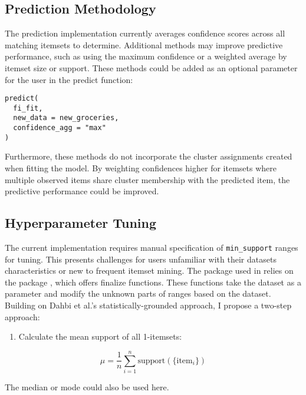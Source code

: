 \documentclass[
  article]{jss}
\providecommand{\tightlist}{%
  \setlength{\itemsep}{0pt}\setlength{\parskip}{0pt}}\usepackage{longtable,booktabs,array}
\begin{document}
\subsection{Prediction Methodology}\label{prediction-methodology}

The prediction implementation currently averages confidence scores
across all matching itemsets to determine. Additional methods may
improve predictive performance, such as using the maximum confidence
\citep{mobasher_effective_2001} or a weighted average by itemset size or
support. These methods could be added as an optional parameter for the
user in the predict function:

\begin{verbatim}
predict(
  fi_fit,
  new_data = new_groceries,
  confidence_agg = "max"
)
\end{verbatim}

Furthermore, these methods do not incorporate the cluster assignments
created when fitting the model. By weighting confidences higher for
itemsets where multiple observed items share cluster membership with the
predicted item, the predictive performance could be improved.

\subsection{Hyperparameter Tuning}\label{hyperparameter-tuning-1}

The current implementation requires manual specification of
\texttt{min\_support} ranges for tuning. This presents challenges for
users unfamiliar with their datasets characteristics or new to frequent
itemset mining. The  package used in  relies on
the  package \citep{kuhn_dials_2024}, which offers finalize
functions. These functions take the dataset as a parameter and modify
the unknown parts of ranges based on the dataset. Building on Dahbi et
al.'s \citeyearpar{dahbi_finding_2021} statistically-grounded approach,
I propose a two-step approach:

\begin{enumerate}
\def\labelenumi{\arabic{enumi}.}
\tightlist
\item
  Calculate the mean support of all 1-itemsets:
\end{enumerate}

\[
\mu = \frac{1}{n}\sum^n_{i=1}{\text{support}(\{\text{item}_i\})}
\]

The median or mode could also be used here.
\end{document}
